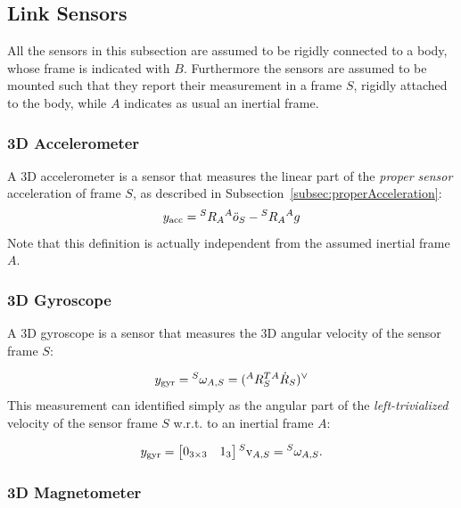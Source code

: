 \subsection{Link Sensors}
\label{subsec:linkSensors}
All the sensors in this subsection are assumed to be rigidly connected to a body, whose frame is indicated with $B$. Furthermore the sensors are assumed to be mounted such that they report their measurement in a frame $S$, rigidly attached to the body, while $A$ indicates as usual an inertial frame.

\subsubsection{3D Accelerometer} 
\label{subsec:accelerometer}
A 3D accelerometer is a sensor that measures the linear part of the \emph{proper sensor} acceleration of frame $S$, as described in Subsection~\ref{subsec:properAcceleration}:
\begin{equation}
y_{\text{acc}} = \hspace{0em}^S R_A \hspace{0em}^A \ddot{o}_S - \hspace{0em}^S R_A \hspace{0em}^A g
\end{equation}
Note that this definition is actually independent from the assumed inertial frame $A$.



\subsubsection{3D Gyroscope} 
A 3D gyroscope is a sensor that measures the 3D angular velocity of the sensor frame $S$:

\begin{equation}
y_{\text{gyr}} = \hspace{0em}^S \omega_{A,S} = ( \hspace{0em}^A {R}_S^T  \hspace{0em}^A \dot{R}_S )^\vee
\end{equation}
This measurement can identified simply as the angular part of the \emph{left-trivialized} velocity of the sensor frame $S$ w.r.t. to an inertial frame $A$:

\begin{equation}
y_{\text{gyr}} = \begin{bmatrix} 0_{3\times 3} & 1_3 \end{bmatrix}  \hspace{0em}^S {\rm v}_{A,S} = \hspace{0em}^S {\omega}_{A,S}.
\end{equation}

\subsubsection{3D Magnetometer}

